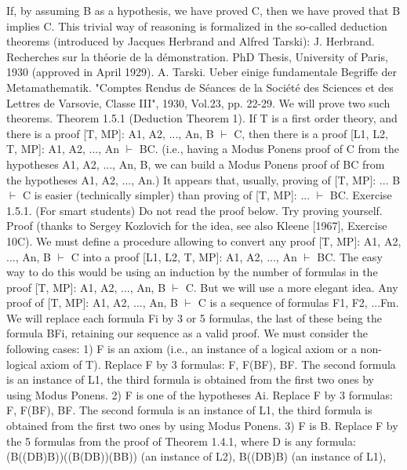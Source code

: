 If, by assuming B as a hypothesis, we have proved C, then we have proved that B implies C. This trivial
way of reasoning is formalized in the so-called deduction theorems (introduced by Jacques Herbrand
and Alfred Tarski):
J. Herbrand. Recherches sur la théorie de la démonstration. PhD Thesis, University of Paris, 1930 (approved in April 1929).
A. Tarski. Ueber einige fundamentale Begriffe der Metamathematik. "Comptes Rendus de Séances de la Société des Sciences
et des Lettres de Varsovie, Classe III", 1930, Vol.23, pp. 22-29.
We will prove two such theorems.
Theorem 1.5.1 (Deduction Theorem 1). If T is a first order theory, and there is a proof [T, MP]: A1,
A2, ..., An, B \(\vdash\) C, then there is a proof [L1, L2, T, MP]: A1, A2, ..., An \(\vdash\) B\IMPLIES C. (i.e., having a Modus
Ponens proof of C from the hypotheses A1, A2, ..., An, B, we can build a Modus Ponens proof of B\IMPLIES C
from the hypotheses A1, A2, ..., An.)
It appears that, usually, proving of [T, MP]: ... B \(\vdash\) C is easier (technically simpler) than proving of [T,
MP]: ... \(\vdash\) B\IMPLIES C.
Exercise 1.5.1. (For smart students) Do not read the proof below. Try proving yourself.
Proof (thanks to Sergey Kozlovich for the idea, see also Kleene [1967], Exercise 10C). We must define a
procedure allowing to convert any proof [T, MP]: A1, A2, ..., An, B \(\vdash\) C into a proof [L1, L2, T, MP]: A1,
A2, ..., An \(\vdash\) B\IMPLIES C.
The easy way to do this would be using an induction by the number of formulas in the proof [T, MP]: A1,
A2, ..., An, B \(\vdash\) C. But we will use a more elegant idea. Any proof of [T, MP]: A1, A2, ..., An, B \(\vdash\) C is a
sequence of formulas F1, F2, ...Fm. We will replace each formula Fi by 3 or 5 formulas, the last of these
being the formula B\IMPLIES Fi, retaining our sequence as a valid proof.
We must consider the following cases:
1) F is an axiom (i.e., an instance of a logical axiom or a non-logical axiom of T). Replace F by 3
formulas: F, F\IMPLIES (B\IMPLIES F), B\IMPLIES F. The second formula is an instance of L1, the third formula is obtained
from the first two ones by using Modus Ponens.
2) F is one of the hypotheses Ai. Replace F by 3 formulas: F, F\IMPLIES (B\IMPLIES F), B\IMPLIES F. The second formula is an
instance of L1, the third formula is obtained from the first two ones by using Modus Ponens.
3) F is B. Replace F by the 5 formulas from the proof of Theorem 1.4.1, where D is any formula:
(B\IMPLIES ((D\IMPLIES B)\IMPLIES B))\IMPLIES ((B\IMPLIES (D\IMPLIES B))\IMPLIES (B\IMPLIES B)) (an instance of L2),
B\IMPLIES ((D\IMPLIES B)\IMPLIES B) (an instance of L1),
